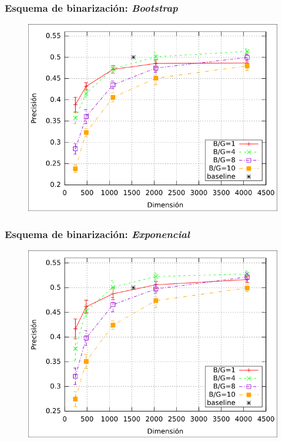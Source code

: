 		\begin{frame}
			\frametitle{Esquema de binarización: \textit{Bootstrap}}
			\begin{figure}[htbp!]
				\centering
				\centerline{
					\includegraphics[height=0.65\paperheight]{../img/resultados/reales/bootstrap.png}
				}
			\end{figure}
		\end{frame}
		\begin{frame}
			\frametitle{Esquema de binarización: \textit{Exponencial}}
			\begin{figure}[htbp!]
				\centering
				\centerline{
					\includegraphics[height=0.65\paperheight]{../img/resultados/reales/expon.png}
				}
			\end{figure}
		\end{frame}
